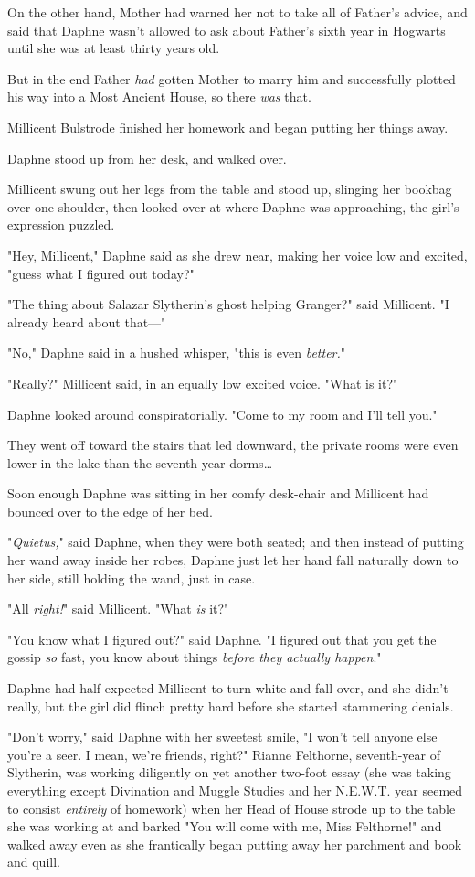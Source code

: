 On the other hand, Mother had warned her not to take all of Father's advice, 
and said that Daphne wasn't allowed to ask about Father's sixth year in 
Hogwarts until she was at least thirty years old.

But in the end Father \emph{had} gotten Mother to marry him and successfully 
plotted his way into a Most Ancient House, so there \emph{was} that.

Millicent Bulstrode finished her homework and began putting her things away.

Daphne stood up from her desk, and walked over.

Millicent swung out her legs from the table and stood up, slinging her bookbag 
over one shoulder, then looked over at where Daphne was approaching, the girl's 
expression puzzled.

"Hey, Millicent," Daphne said as she drew near, making her voice low and 
excited, "guess what I figured out today?"

"The thing about Salazar Slytherin's ghost helping Granger?" said Millicent. "I 
already heard about that---"

"No," Daphne said in a hushed whisper, "this is even \emph{better.}"

"Really?" Millicent said, in an equally low excited voice. "What is it?"

Daphne looked around conspiratorially. "Come to my room and I'll tell you."

They went off toward the stairs that led downward, the private rooms were even 
lower in the lake than the seventh-year dorms{\ldots}

Soon enough Daphne was sitting in her comfy desk-chair and Millicent had 
bounced over to the edge of her bed.

"\emph{Quietus,}" said Daphne, when they were both seated; and then instead of 
putting her wand away inside her robes, Daphne just let her hand fall naturally 
down to her side, still holding the wand, just in case.

"All \emph{right!}" said Millicent. "What \emph{is} it?"

"You know what I figured out?" said Daphne. "I figured out that you get the 
gossip \emph{so} fast, you know about things \emph{before they actually 
happen}."

Daphne had half-expected Millicent to turn white and fall over, and she didn't 
really, but the girl did flinch pretty hard before she started stammering 
denials.

"Don't worry," said Daphne with her sweetest smile, "I won't tell anyone else 
you're a seer. I mean, we're friends, right?"
\sbreak
Rianne Felthorne, seventh-year of Slytherin, was working diligently on yet 
another two-foot essay (she was taking everything except Divination and Muggle 
Studies and her N.E.W.T. year seemed to consist \emph{entirely} of homework) 
when her Head of House strode up to the table she was working at and barked 
"You will come with me, Miss Felthorne!" and walked away even as she 
frantically began putting away her parchment and book and quill.

